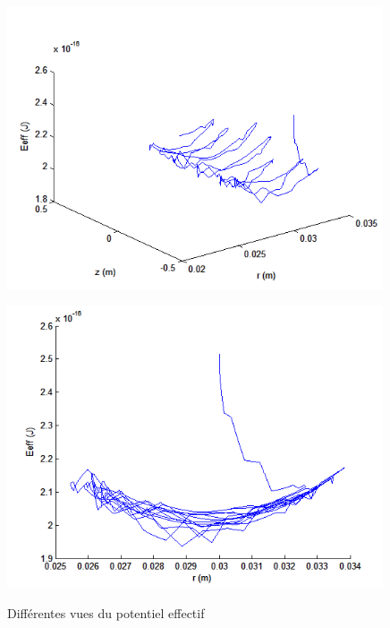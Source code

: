 \documentclass[a4paper,12pt]{article}
\begin{document}
\begin{figure}[h]
   \begin{minipage}[c]{.49\linewidth}
      \includegraphics[width=0.99\textwidth,height=0.8\textwidth]{images/Eeff_3d}
      \label{f Eeff_3d}
   \end{minipage}
   \begin{minipage}[c]{.49\linewidth}
      \includegraphics[width=0.99\textwidth,height=0.8\textwidth]{images/Eeff_rEeff}
      \label{f Eeff_xy}
   \end{minipage}
   \caption{Différentes vues du potentiel effectif}
   \label{f Eeff}
\end{figure}
\end{document}
